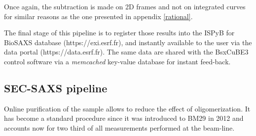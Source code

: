\documentclass[preprint]{iucr}              %
\begin{document}
Once again, the subtraction is made on 2D frames and not on integrated curves for similar reasons as the one presented in appendix \ref{rational}.



The final stage of this pipeline is to register those results into the ISPyB for BioSAXS database \cite{ISPYBB} (https://exi.esrf.fr), and instantly available to the user via the data portal (https://data.esrf.fr). 
The same data are shared with the BsxCuBE3 control software via a \textit{memcached} key-value database for instant feed-back.

\subsection{SEC-SAXS pipeline}
Online purification of the sample allows to reduce the effect of oligomerization.
It has become a standard procedure since it was introduced to BM29 in 2012 \cite{SECPaper2012} and accounts now for two third of all measurements performed at the beam-line.
\end{document}
